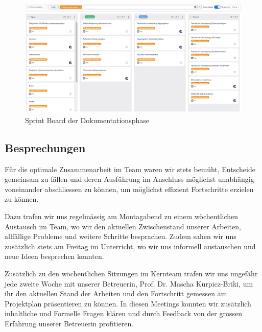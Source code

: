 \begin{figure}[H]
	\begin{center}
        \centering
		\includegraphics[width=1\linewidth]{./images/kanban_board.PNG}
		\caption{Sprint Board der Dokumentationsphase}
        \label{sprint-board-screenshot}
	\end{center}
\end{figure}

\subsection{Besprechungen}

Für die optimale Zusammenarbeit im Team waren wir stets bemüht, Entscheide gemeinsam zu fällen und
deren Ausführung im Anschluss möglichst unabhängig voneinander abschliessen zu können, um möglichst
effizient Fortschritte erzielen zu können.

Dazu trafen wir uns regelmässig am Montagabend zu einem wöchentlichen Austausch im Team, wo wir den
aktuellen Zwischenstand unserer Arbeiten, allfällige Probleme und weitere Schritte besprachen.
Zudem sahen wir uns zusätzlich stets am Freitag im Unterricht, wo wir uns informell austauschen und
neue Ideen besprechen konnten.

Zusätzlich zu den wöchentlichen Sitzungen im Kernteam trafen wir uns ungefähr jede zweite Woche mit
unserer Betreuerin, Prof. Dr. Mascha Kurpicz-Briki, um ihr den aktuellen Stand der Arbeiten und den
Fortschritt gemessen am Projektplan präsentieren zu können. In diesen Meetings konnten wir zusätzlich
inhaltliche und Formelle Fragen klären und durch Feedback von der grossen Erfahrung unserer Betreuerin
profitieren.
